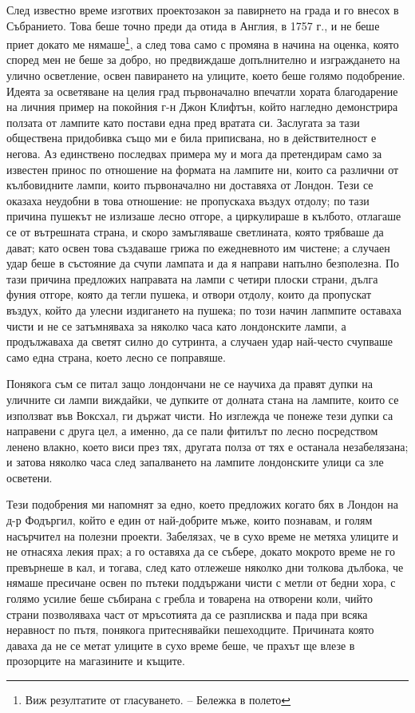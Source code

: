 \documentclass[12pt]{book}
\begin{document}
След известно време изготвих проектозакон за павирнето на града и го внесох в Събранието. Това беше точно преди да отида в Англия, в 1757 г., и не беше приет докато ме нямаше\footnote{Виж резултатите от гласуването. – Бележка в полето}, а след това само с промяна в начина на оценка, която според мен не беше за добро, но предвиждаше допълнително и изграждането на улично осветление, освен павирането на улиците, което беше голямо подобрение. Идеята за осветяване на целия град първоначално впечатли хората благодарение на личния пример на покойния г-н Джон Клифтън, който нагледно демонстрира ползата от лампите като постави една пред вратата си. Заслугата за тази обществена придобивка също ми е била приписвана, но в действителност е негова. Аз единствено последвах примера му и мога да претендирам само за известен принос по отношение на формата на лампите ни, които са различни от кълбовидните лампи, които първоначално ни доставяха от Лондон. Тези се оказаха неудобни в това отношение: не пропускаха въздух отдолу; по тази причина пушекът  не излизаше лесно отгоре, а циркулираше в кълбото, отлагаше се от вътрешната страна, и скоро замъгляваше светлината, която  трябваше да дават; като освен това създаваше грижа по ежедневното им чистене; а случаен удар беше в състояние да счупи лампата и да я направи напълно безполезна. По тази причина предложих направата на лампи с четири плоски страни, дълга фуния отгоре, която да тегли пушека, и отвори отдолу, които да пропускат въздух, който да улесни издигането на пушека; по този начин лапмпите оставаха чисти и не се затъмняваха за няколко часа като лондонските лампи, а продължаваха да светят силно до сутринта, а случаен удар най-често счупваше само една страна, което лесно се поправяше. 

Понякога съм се питал защо лондончани не се научиха да правят дупки на уличните си лампи виждайки, че дупките от долната стана на лампите, които се използват във Воксхал, ги държат чисти. Но изглежда че понеже тези дупки са направени с друга цел, а именно, да се пали фитилът по лесно посредством ленено влакно, което виси през тях, другата полза от тях е останала незабелязана; и затова няколко часа след запалването на лампите лондонските улици са зле осветени.

Тези подобрения ми напомнят за едно, което предложих когато бях в Лондон на д-р Фодъргил, който е един от най-добрите мъже, които познавам, и голям насърчител на полезни проекти. Забелязах, че в сухо време не метяха улиците и не отнасяха лекия прах; а го оставяха да се събере, докато мокрото време не го превърнеше в кал, и тогава, след като отлежеше няколко дни толкова дълбока, че нямаше пресичане освен по пътеки поддържани чисти с метли от бедни хора, с голямо усилие беше събирана с гребла и товарена на отворени коли, чийто страни позволяваха част от мръсотията да се разплисква и пада при всяка неравност по пътя, понякога притеснявайки пешеходците. Причината която даваха да не се метат улиците в сухо време беше, че прахът ще влезе в прозорците на магазините и къщите. 
\end{document}
